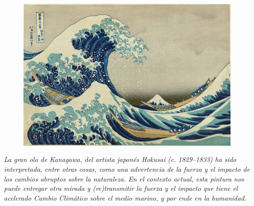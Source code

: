 \documentclass[
]{article}
\begin{document}
\newpage
\begin{figure}

\vspace*{1cm}
\includegraphics[]{images/Exa16.jpg}

\end{figure}

\vspace*{0.5cm}

\begin{center}
\emph{La gran ola de Kanagawa, del artista japonés Hokusai (c. 1829--1833) ha sido interpretada, entre otras cosas, como una advertencia de la fuerza y el impacto de los cambios abruptos sobre la naturaleza. En el contexto actual, esta pintura nos puede entregar otra mirada y (re)transmitir la fuerza y el impacto que tiene el acelerado Cambio Climático sobre el medio marino, y por ende en la humanidad.}


\end{center}
\end{document}
